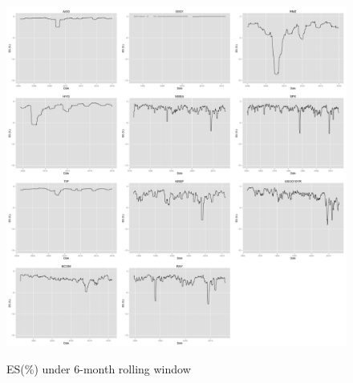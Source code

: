 \documentclass[12pt]{article}
\begin{document}
\begin{figure}[h]
\caption{ES(\%) under 6-month rolling window} 
\centering 
\includegraphics[width=15cm]{../results/ES6mon_scaled}
\label{fig: ES6mon}
\end{figure}



% 
% 
\end{document}
